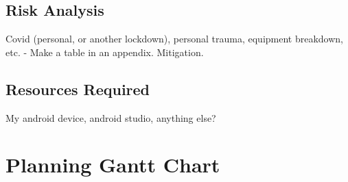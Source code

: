 \documentclass[11pt, a4paper, notitlepage]{report}
\begin{document}
\section{Risk Analysis}
Covid (personal, or another lockdown), personal trauma, equipment breakdown, 
etc. - Make a table in an appendix. Mitigation.
\section{Resources Required}
My android device, android studio, anything else?

\appendix
\chapter{Planning Gantt Chart}\label{planGanttChart}
\end{document}
